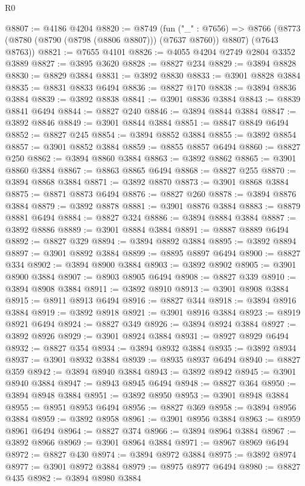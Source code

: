 \begin{lexlean}{R0}
\begin{coremodule}
@8807 := @4186 @4204
@8820 := @8749
    (fun ("_" : @7656) =>
    @8766 (@8773 (@8780 (@8790 (@8798 (@8806 @8807))) (@7637 @8760)) @8807) (@7643 @8763))
@8821 := @7655 @4101
@8826 := @4055 @4204 @2749 @2804 @3352 @3889
@8827 := @3895 @3620
@8828 := @8827 @234
@8829 := @3894 @8828
@8830 := @8829 @3884
@8831 := @3892 @8830
@8833 := @3901 @8828 @3884
@8835 := @8831 @8833 @6494
@8836 := @8827 @170
@8838 := @3894 @8836 @3884
@8839 := @3892 @8838
@8841 := @3901 @8836 @3884
@8843 := @8839 @8841 @6494
@8844 := @8827 @240
@8846 := @3894 @8844 @3884
@8847 := @3892 @8846
@8849 := @3901 @8844 @3884
@8851 := @8847 @8849 @6494
@8852 := @8827 @245
@8854 := @3894 @8852 @3884
@8855 := @3892 @8854
@8857 := @3901 @8852 @3884
@8859 := @8855 @8857 @6494
@8860 := @8827 @250
@8862 := @3894 @8860 @3884
@8863 := @3892 @8862
@8865 := @3901 @8860 @3884
@8867 := @8863 @8865 @6494
@8868 := @8827 @255
@8870 := @3894 @8868 @3884
@8871 := @3892 @8870
@8873 := @3901 @8868 @3884
@8875 := @8871 @8873 @6494
@8876 := @8827 @260
@8878 := @3894 @8876 @3884
@8879 := @3892 @8878
@8881 := @3901 @8876 @3884
@8883 := @8879 @8881 @6494
@8884 := @8827 @324
@8886 := @3894 @8884 @3884
@8887 := @3892 @8886
@8889 := @3901 @8884 @3884
@8891 := @8887 @8889 @6494
@8892 := @8827 @329
@8894 := @3894 @8892 @3884
@8895 := @3892 @8894
@8897 := @3901 @8892 @3884
@8899 := @8895 @8897 @6494
@8900 := @8827 @334
@8902 := @3894 @8900 @3884
@8903 := @3892 @8902
@8905 := @3901 @8900 @3884
@8907 := @8903 @8905 @6494
@8908 := @8827 @339
@8910 := @3894 @8908 @3884
@8911 := @3892 @8910
@8913 := @3901 @8908 @3884
@8915 := @8911 @8913 @6494
@8916 := @8827 @344
@8918 := @3894 @8916 @3884
@8919 := @3892 @8918
@8921 := @3901 @8916 @3884
@8923 := @8919 @8921 @6494
@8924 := @8827 @349
@8926 := @3894 @8924 @3884
@8927 := @3892 @8926
@8929 := @3901 @8924 @3884
@8931 := @8927 @8929 @6494
@8932 := @8827 @354
@8934 := @3894 @8932 @3884
@8935 := @3892 @8934
@8937 := @3901 @8932 @3884
@8939 := @8935 @8937 @6494
@8940 := @8827 @359
@8942 := @3894 @8940 @3884
@8943 := @3892 @8942
@8945 := @3901 @8940 @3884
@8947 := @8943 @8945 @6494
@8948 := @8827 @364
@8950 := @3894 @8948 @3884
@8951 := @3892 @8950
@8953 := @3901 @8948 @3884
@8955 := @8951 @8953 @6494
@8956 := @8827 @369
@8958 := @3894 @8956 @3884
@8959 := @3892 @8958
@8961 := @3901 @8956 @3884
@8963 := @8959 @8961 @6494
@8964 := @8827 @374
@8966 := @3894 @8964 @3884
@8967 := @3892 @8966
@8969 := @3901 @8964 @3884
@8971 := @8967 @8969 @6494
@8972 := @8827 @430
@8974 := @3894 @8972 @3884
@8975 := @3892 @8974
@8977 := @3901 @8972 @3884
@8979 := @8975 @8977 @6494
@8980 := @8827 @435
@8982 := @3894 @8980 @3884

\end{coremodule}
\end{lexlean}
